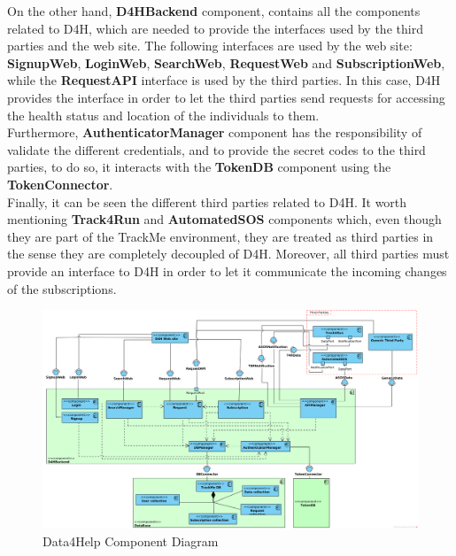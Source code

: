 \documentclass[a4paper, hidelinks, 12pt]{report}
\begin{document}
		On the other hand, \textbf{D4HBackend} component, contains all the components related to D4H, which are needed to provide the interfaces used by the third parties and the web site. The following interfaces are used by the web site: \textbf{SignupWeb}, \textbf{LoginWeb}, \textbf{SearchWeb}, \textbf{RequestWeb} and  \textbf{SubscriptionWeb}, while the \textbf{RequestAPI} interface is used by the third parties. In this case, D4H provides the interface in order to let the third parties send requests for accessing the health status and location of the individuals to them.\\
		
		Furthermore, \textbf{AuthenticatorManager} component has the responsibility of validate the different credentials, and to provide the secret codes to the third parties, to do so, it interacts with the \textbf{TokenDB} component using the \textbf{TokenConnector}.\\
		
		Finally, it can be seen the different third parties related to D4H. It worth mentioning \textbf{Track4Run} and \textbf{AutomatedSOS} components which, even though they are part of the TrackMe environment, they are treated as third parties in the sense they are completely decoupled of D4H. Moreover, all third parties must provide an interface to D4H in order to let it communicate the incoming changes of the subscriptions.\\
	
			\begin{figure}
    				\centering
				\includegraphics[width=1\textwidth]{diagrams/d4h_component_diagram.png}
				\caption[Data4Help Component Diagram]{Data4Help Component Diagram}
				\label{fig:d4h_component_diagram}
			\end{figure}	
			\clearpage
\end{document}
